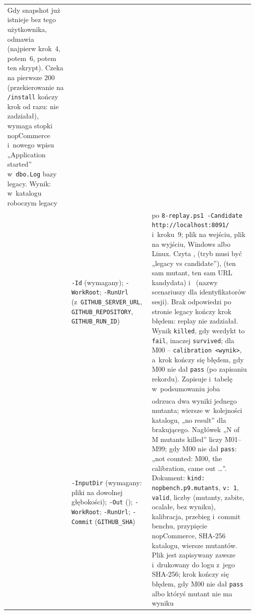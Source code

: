{\begin{xltabular}{\linewidth}{@{}>{\raggedright\arraybackslash}p{3.1cm} >{\raggedright\arraybackslash}p{3.7cm} >{\raggedright\arraybackslash}X@{}}
  Gdy snapshot już istnieje bez tego użytkownika, odmawia (najpierw krok~4, potem~6, potem ten
  skrypt). Czeka na pierwsze 200 (przekierowanie na \texttt{/install} kończy krok od razu:
   nie zadziałał), wymaga stopki nopCommerce i~nowego wpisu „Application
  started” w~\texttt{dbo.Log} bazy legacy. Wynik:  w~katalogu
  roboczym legacy \\
 & \texttt{-Id} (wymagany); \texttt{-WorkRoot}; \texttt{-RunUrl}
  (z~\texttt{GITHUB\_SERVER\_URL}, \texttt{GITHUB\_REPOSITORY}, \texttt{GITHUB\_RUN\_ID}) &
  po \texttt{8-replay.ps1 -Candidate http://localhost:8091/} i~kroku~9; plik na wejściu, plik
  na wyjściu, Windows albo Linux. Czyta ,  (tryb
  musi być „legacy vs candidate”),  (ten sam mutant, ten sam URL
  kandydata) i~ (nazwy scenariuszy dla identyfikatorów sesji). Brak
  odpowiedzi po stronie legacy kończy krok błędem: replay nie zadziałał. Wynik
  \texttt{killed}, gdy werdykt to \texttt{fail}, inaczej \texttt{survived}; dla M00 --
  \texttt{calibration <wynik>}, a~krok kończy się błędem, gdy M00 nie dał \texttt{pass} (po
  zapisaniu rekordu). Zapisuje  i~tabelę w~podsumowaniu joba \\
 & \texttt{-InputDir} (wymagany: pliki  na
  dowolnej głębokości); \texttt{-Out} ();
  \texttt{-WorkRoot}; \texttt{-RunUrl}; \texttt{-Commit} (\texttt{GITHUB\_SHA}) &
  odrzuca dwa wyniki jednego mutanta; wiersze w~kolejności katalogu, „no result” dla
  brakującego. Nagłówek „N of M mutants killed” liczy M01--M99; gdy M00 nie dał \texttt{pass}:
  „not counted: M00, the calibration, came out …”. Dokument: \texttt{kind:
  nopbench.p9.mutants}, \texttt{v: 1}, \texttt{valid}, liczby (mutanty, zabite, ocalałe, bez
  wyniku), kalibracja, przebieg i~commit benchu, przypięcie nopCommerce, SHA-256 katalogu,
  wiersze mutantów. Plik jest zapisywany zawsze i~drukowany do logu z~jego SHA-256; krok
  kończy się błędem, gdy M00 nie dał \texttt{pass} albo któryś mutant nie ma wyniku \\
\end{xltabular}
}


